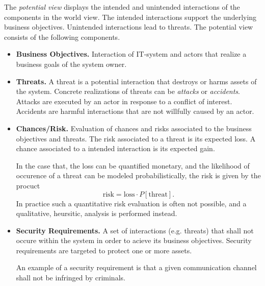 The \emph{potential view} displays the intended and unintended interactions of the components in the world view.
The intended interactions support the underlying business objectives.
Unintended interactions lead to threats.
The potential view consists of the following components.
\begin{itemize}
\item \textbf{Business Objectives.}
Interaction of IT-system and actors that realize a business goals of the system owner.

\item \textbf{Threats.}
A threat is a potential interaction that destroys or harms assets of the system.
Concrete realizations of threats can be \emph{attacks} or \emph{accidents}.
Attacks are executed by an actor in response to a conflict of interest.
Accidents are harmful interactions that are not willfully caused by an actor.

\item \textbf{Chances/Risk.}
Evaluation of chances and risks associated to the business objectives and threats.
The risk associated to a threat is its expected loss.
A chance associated to a intended interaction is its expected gain.

In the case that, the loss can be quantified monetary, and the likelihood of occurence of a threat can
be modeled probabilistically, the risk is given by the procuct
\[ \text{risk} = \text{loss} \cdot P[\text{threat}]. \]
In practice such a quantitative risk evaluation is often not possible, and a qualitative, heursitic, analysis is performed instead.

\item \textbf{Security Requirements.}
A set of interactions (e.g. threats) that shall not occure within the system in order to acieve its business objectives.
Security requirements are targeted to protect one or more assets.

An example of a security requirement is that a given communication channel shall not be infringed by criminals.
\end{itemize}




